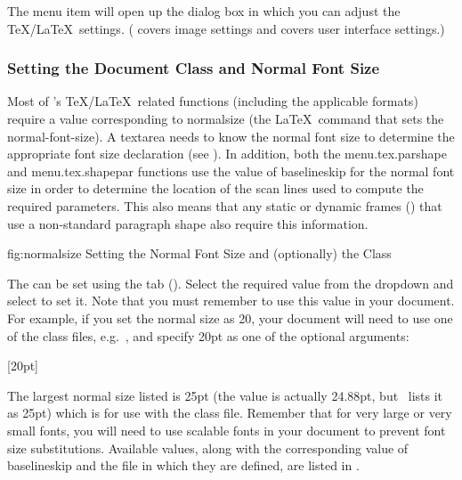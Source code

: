The  menu item will open up 
the  dialog box
in which you can adjust the \TeX\slash\LaTeX\ settings.
( covers image settings
and  covers user interface settings.)


\subsubsection{Setting the Document Class and Normal Font Size}
\label{sec:normalsize}


Most of \FlowframTk's \TeX\slash\LaTeX\ related functions (including the
applicable  formats) require a value
corresponding to \gls{normalsize} (the \LaTeX\ command that sets the
\gls{normal-font-size}). A \gls{textarea} needs to know the normal
font size to determine the appropriate font size declaration (see
). In addition, both the
\gls{menu.tex.parshape} and \gls{menu.tex.shapepar} functions use
the value of \gls{baselineskip} for the normal font size in order to
determine the location of the scan lines used to compute the
required parameters. This also means that any static or dynamic
frames () that use a non-standard paragraph
shape also require this information.

\FloatFig
 {fig:normalsize}
 {}
 {Setting the Normal Font Size and (optionally) the Class}


The  can be set using the
 tab ().  Select the
required value from the  \gls*{dropdown} and select
 to set it. Note that you must remember
to use this value in your document. For example, if you set the
normal size as 20, your document will need to use one of the
 class files, e.g.\ , and specify
20\gls{pt} as one of the optional arguments:
\begin{codebox}
[20pt]
\end{codebox}

The largest normal size listed is 25pt (the value is actually
24.88pt, but \FlowframTk\ lists it as 25pt) which is for use with the
 class file. Remember that for very large or very
small fonts, you will need to use scalable fonts in your document to
prevent font size substitutions.  Available values, along with the
corresponding value of \gls{baselineskip} and the file in which they
are defined, are listed in .

